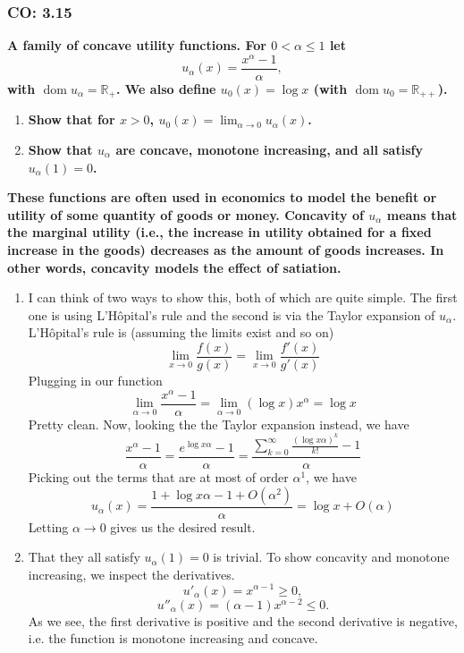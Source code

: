 \subsubsection{CO: 3.15}
\textbf{A family of concave utility functions. For $0 < \alpha \leq 1$ let}
\[
    u_\alpha(x) = \frac{x^\alpha - 1}{\alpha},
\]
\textbf{with $\operatorname{dom} u_\alpha = \mathbb{R}_+$. We also define $u_0(x) = \log x$ (with $\operatorname{dom} u_0 = \mathbb{R}_{++}$).}
\begin{enumerate}[label=(\alph*)]
    \item \textbf{Show that for $x > 0$, $u_0(x) = \lim_{\alpha \to 0} u_\alpha(x)$.}
    \item \textbf{Show that $u_\alpha$ are concave, monotone increasing, and all satisfy $u_\alpha(1) = 0$.}
\end{enumerate}
\textbf{These functions are often used in economics to model the benefit or utility of some quantity of goods or money.
Concavity of $u_\alpha$ means that the marginal utility (i.e., the increase in utility obtained for a fixed increase in the goods) decreases as the amount of goods increases.
In other words, concavity models the effect of satiation.}
\begin{enumerate}
    \item[a)] I can think of two ways to show this, both of which are quite simple.
    The first one is using L'Hôpital's rule and the second is via the Taylor expansion of $u_\alpha$.
    L'Hôpital's rule is (assuming the limits exist and so on)
    \[
        \lim_{x \to 0}\frac{f(x)}{g(x)} = \lim_{x \to 0} \frac{f'(x)}{g'(x)}
    \]
    Plugging in our function
    \[
        \lim_{\alpha \to 0} \frac{x^\alpha - 1}{\alpha} = \lim_{\alpha \to 0} (\log x) x^\alpha = \log x
    \]
    Pretty clean. 
    Now, looking the the Taylor expansion instead, we have
    \[
        \frac{x^\alpha - 1}{\alpha} = \frac{e^{\log x \alpha} - 1}{\alpha} = \frac{\sum_{k=0}^{\infty} \frac{(\log x \alpha)^k}{k!} - 1}{\alpha}
    \]
    Picking out the terms that are at most of order $\alpha^1$, we have
    \[
        u_\alpha(x) = \frac{1 + \log x \alpha - 1 + O(\alpha^2)}{\alpha} = \log x + O(\alpha)
    \] 
    Letting $\alpha \to 0$ gives us the desired result.
    \item[b)] 
    That they all satisfy $u_\alpha(1) = 0$ is trivial. 
    To show concavity and monotone increasing, we inspect the derivatives.
    \[
        u'_\alpha(x) = x^{\alpha - 1} \geq 0,
    \]
    \[
        u''_\alpha(x) = (\alpha - 1)x^{\alpha - 2} \leq 0.
    \]
    As we see, the first derivative is positive and the second derivative is negative, i.e. the function is monotone increasing and concave.
\end{enumerate}

